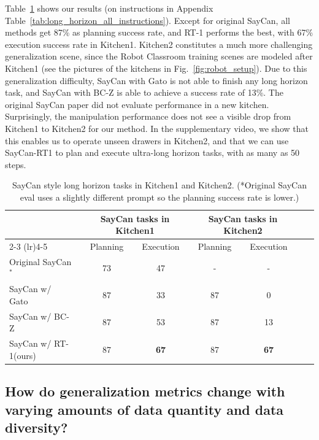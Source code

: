 \documentclass{article} %
\newcommand{\algname}{RT-1\xspace}
\begin{document}
Table~\ref{table:saycan} shows our results (on instructions in Appendix Table~\ref{tab:long_horizon_all_instructions}). Except for original SayCan, all methods get 87\% as planning success rate, and RT-1 performs the best, with 67\% execution success rate in Kitchen1. Kitchen2 constitutes a much more challenging generalization scene, since the Robot Classroom training scenes are modeled after Kitchen1 (see the pictures of the kitchens in Fig.~\ref{fig:robot_setup}). Due to this generalization difficulty, SayCan with Gato is not able to finish any long horizon task, and SayCan with BC-Z is able to achieve a success rate of 13\%. The original SayCan paper did not evaluate performance in a new kitchen. 
Surprisingly, the manipulation performance does not see a visible drop from Kitchen1 to Kitchen2 for our method. In the supplementary video, we show that this enables us to operate unseen drawers in Kitchen2, and that we can use SayCan-RT1 to plan and execute ultra-long horizon tasks, with as many as 50 steps.

\begin{table}[h!]
\begin{center}
  \vspace{-1.0em}
  \setlength\tabcolsep{2.0pt}
  \scriptsize
  \begin{tabular}{@{}lcccccc@{}}
  \toprule
  \multicolumn{1}{l}{} & \multicolumn{2}{c}{SayCan tasks in Kitchen1} & \multicolumn{2}{c}{SayCan tasks in Kitchen2} &\\
  \cmidrule(lr){2-3} \cmidrule(lr){4-5} 
   & Planning & Execution &  Planning & Execution &  \\
  \midrule
 Original SayCan~\citep{ahn2022can}$^*$ & 73 & 47 & - & -\\
  SayCan w/ Gato~\citep{reed2022generalist} & 87 & 33 & 87 & 0\\
  SayCan w/ BC-Z~\citep{jang2022bc} & 87 & 53 & 87 & 13\\
  SayCan w/ \algname (ours) & 87 & \textbf{67} & 87 & \textbf{67}\\
  \bottomrule
  \end{tabular}
  \caption{SayCan style long horizon tasks in Kitchen1 and Kitchen2. (*Original SayCan eval uses a slightly different prompt so the planning success rate is lower.)}
  \label{table:saycan}
\end{center}
\end{table}






\subsection{How do generalization metrics change with varying amounts of data quantity and data diversity?}\label{sec:exp_data}
\end{document}
